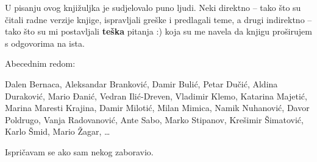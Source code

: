 
U pisanju ovog knjižuljka je sudjelovalo puno ljudi.
Neki direktno -- tako što su čitali radne verzije knjige, ispravljali greške i predlagali teme, a drugi indirektno -- tako što su mi postavljali \textbf{teška} pitanja :) koja su me navela da knjigu proširujem s odgovorima na ista.

Abecednim redom:

Dalen Bernaca,
Aleksandar Branković,
Damir Bulić,
Petar Dučić,
Aldina Duraković,
Mario Đanić,
Vedran Ilić-Dreven,
Vladimir Klemo,
Katarina Majetić,
Marina Maresti Krajina,
Damir Milotić, 
Milan Mimica,
Namik Nuhanović,
Davor Poldrugo,
Vanja Radovanović,
Ante Sabo,
Marko Stipanov,
Krešimir Šimatović,
Karlo Šmid,
Mario Žagar,
\dots

Ispričavam se ako sam nekog zaboravio.
